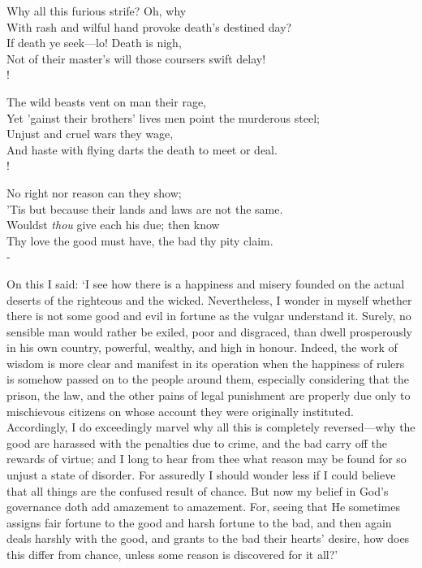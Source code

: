 \documentclass[11pt]{book}
\newenvironment{vpoem}[1]%
  {%
    \centerpoemon{Down their cheeks unfeigned the tear drops}
    \def\poemvsindentlines{#1}\begin{poem}\footnotesize%
  }%
  {%
    \end{poem}\def\poemvsindentlines{\relax}%
    \centerpoemoff
  }
\begin{document}
\begin{vpoem}{13}
      Why all this furious strife? Oh, why \\
    With rash and wilful hand provoke death's destined day? \\
      If death ye seek---lo! Death is nigh, \\
    Not of their master's will those coursers swift delay! \\!

      The wild beasts vent on man their rage, \\
    Yet 'gainst their brothers' lives men point the murderous steel; \\
      Unjust and cruel wars they wage, \\
    And haste with flying darts the death to meet or deal. \\!

      No right nor reason can they show; \\
    'Tis but because their lands and laws are not the same. \\
      Wouldst \emph{thou} give each his due; then know \\
    Thy love the good must have, the bad thy pity claim. \\-
\end{vpoem}

On this I said: `I see how there is a happiness and misery founded on
the actual deserts of the righteous and the wicked. Nevertheless, I
wonder in myself whether there is not some good and evil in fortune as
the vulgar understand it. Surely, no sensible man would rather be
exiled, poor and disgraced, than dwell prosperously in his own country,
powerful, wealthy, and high in honour. Indeed, the work of wisdom is
more clear and manifest in its operation when the happiness of rulers is
somehow passed on to the people around them, especially considering that
the prison, the law, and the other pains of legal punishment are
properly due only to mischievous citizens on whose account they were
originally instituted. Accordingly, I do exceedingly marvel why all this
is completely reversed---why the good are harassed with the penalties due
to crime, and the bad carry off the rewards of virtue; and I long to
hear from thee what reason may be found for so unjust a state of
disorder. For assuredly I should wonder less if I could believe that all
things are the confused result of chance. But now my belief in God's
governance doth add amazement to amazement. For, seeing that He
sometimes assigns fair fortune to the good and harsh fortune to the bad,
and then again deals harshly with the good, and grants to the bad their
hearts' desire, how does this differ from chance, unless some reason is
discovered for it all?'
\end{document}
